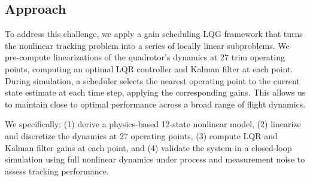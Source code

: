 \documentclass[11pt]{amsart}
\begin{document}
\subsection{Approach}
To address this challenge, we apply a gain scheduling LQG framework that turns the nonlinear tracking problem into a series of locally linear subproblems. We pre-compute linearizations of the quadrotor's dynamics at 27 trim operating points, computing an optimal LQR controller and Kalman filter at each point. During simulation, 
a scheduler selects the nearest operating point to the current state estimate at each time step, applying the corresponding gains. This allows us to maintain close to optimal performance across a broad range of flight dynamics.

We specifically: (1) derive a physics-based 12-state nonlinear model, (2) linearize and discretize the dynamics at 27 operating points, (3) compute LQR and Kalman filter gains at each point, and (4) validate the system in a closed-loop simulation using full nonlinear dynamics under process and measurement noise to assess tracking performance.


\end{document}
